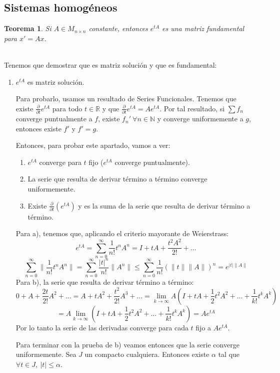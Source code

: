 \documentclass{article}
\makeatletter
\providecommand{\norm}[1]{\lVert#1\rVert}
\providecommand{\abs}[1]{\lvert#1\rvert}
\theoremstyle{theorem-style}  %
\newtheorem{theorem}{Teorema}[section]  %
\theoremstyle{definition-style}
\theoremstyle{example-style}
\renewenvironment{proof}[1][\proofname]{\par
	\pushQED{\qed}%
	\normalfont \topsep6\p@\@plus6\p@\relax
	\list{}{%
		\settowidth{\leftmargin}{\quad:\hskip\labelsep}%
		\setlength{\labelwidth}{0pt}%
		\setlength{\itemindent}{-\leftmargin}%
	}%
	\item[\hskip\labelsep\itshape#1\@addpunct{:}]\ignorespaces
}{%
	\popQED\endlist\@endpefalse
}
\makeatother
\begin{document}
\subsection{Sistemas homogéneos}
\begin{theorem}
	Si $ A\in M_{n\times n} $ constante, entonces $ e^{tA} $ es una matriz fundamental para $ x'=Ax $.
\end{theorem}
\begin{proof} \ \\
	Tenemos que demostrar que es matriz solución y que es fundamental:
	\begin{enumerate}[\quad i)]
		\item $ e^{tA} $ es matriz solución. 
		
		Para probarlo, usamos un resultado de Series Funcionales. Tenemos que existe $ \frac{\partial}{\partial t}e^{tA}$ para todo $t \in \mathbb{R} $ y que $ \frac{\partial}{\partial t}e^{tA}=Ae^{tA} $. Por tal resultado, si $ \sum f_n $ converge puntualmente a $ f $, existe $ f_n'\ \forall n \in \mathbb{N} $ y converge uniformemente a $ g $, entonces existe $ f' $ y $ f'=g $.
		
		Entonces, para probar este apartado, vamos a ver:
		\begin{enumerate}[\quad a)]
			\item $ e^{tA} $ converge para $ t $ fijo ($ e^{tA} $ converge puntualmente).
			\item La serie que resulta de derivar término a término converge uniformemente.
			\item Existe $ \frac{\partial}{\partial t} (e^{tA}) $ y es la suma de la serie que resulta de derivar término a término.
		\end{enumerate}
		Para a), tenemos que, aplicando el criterio mayorante de Weierstrass:
		\[ e^{tA}=\sum_{n=0}^{\infty} \frac{1}{n!}t^nA^n=I+tA+\frac{t^2A^2}{2!}+\dots \]
		\[ \sum_{n=0}^{\infty} \norm{\frac{1}{n!}t^nA^n}=\sum_{n=0}^{\infty} \frac{\abs{t}^n}{n!}\norm{A^n}\leq \sum_{n=0}^{\infty} \frac{1}{n!}(\norm{t}\norm{A})^n = e^{\abs{t}\norm{A}}\]
		Para b), la serie que resulta de derivar término a término:
		\[ 0+A+ \frac{2t}{2!}A^2+\dots =A+tA^2+\frac{t^2}{2!}A^3+\dots =\lim\limits_{k\to\infty} A(I+tA+\frac{1}{2}t^2A^2+\dots+\frac{1}{k!}t^kA^k)
		\]
		\[=A\lim\limits_{k\to\infty} (I+tA+\frac{1}{2}t^2A^2+\dots+\frac{1}{k!}t^kA^k) = Ae^{tA} \]
		Por lo tanto la serie de las derivadas converge para cada $ t $ fijo a $ Ae^{tA} $.
		
		Para terminar con la prueba de b) veamos entonces que la serie converge uniformemente. Sea $ J $ un compacto cualquiera. Entonces existe $ \alpha $ tal que $ \forall t \in J, \ \abs{t}\leq \alpha$.
		

\end{enumerate}
\end{proof}
\end{document}
